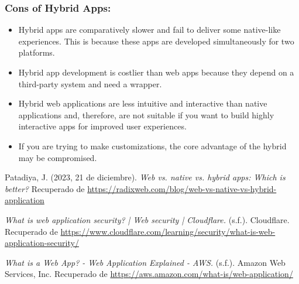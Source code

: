 \documentclass[conference]{IEEEtran}
\begin{document}
\subsubsection{Cons of Hybrid Apps:}
\begin{itemize}
    \item Hybrid apps are comparatively slower and fail to deliver some native-like experiences. This is because these apps are developed simultaneously for two platforms.
    \item Hybrid app development is costlier than web apps because they depend on a third-party system and need a wrapper.
    \item Hybrid web applications are less intuitive and interactive than native applications and, therefore, are not suitable if you want to build highly interactive apps for improved user experiences.
    \item If you are trying to make customizations, the core advantage of the hybrid may be compromised.
\end{itemize}

\begin{thebibliography}{99}
Patadiya, J. (2023, 21 de diciembre). \textit{Web vs. native vs. hybrid apps: Which is better?} Recuperado de \url{https://radixweb.com/blog/web-vs-native-vs-hybrid-application}

\textit{What is web application security? | Web security | Cloudflare.} (s.f.). Cloudflare. Recuperado de \url{https://www.cloudflare.com/learning/security/what-is-web-application-security/}

\textit{What is a Web App? - Web Application Explained - AWS.} (s.f.). Amazon Web Services, Inc. Recuperado de \url{https://aws.amazon.com/what-is/web-application/}
\end{thebibliography}
\end{document}

